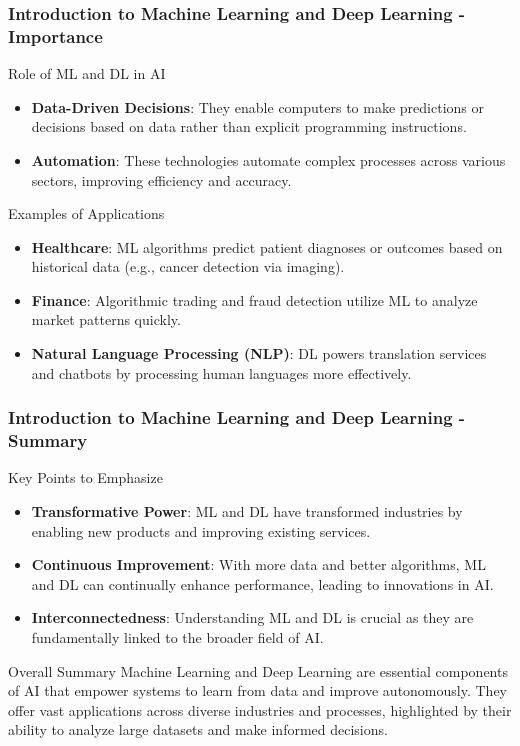 \documentclass[aspectratio=169]{beamer}
\begin{document}
\begin{frame}[fragile]
    \frametitle{Introduction to Machine Learning and Deep Learning - Importance}
    
    \begin{block}{Role of ML and DL in AI}
        \begin{itemize}
            \item \textbf{Data-Driven Decisions}: They enable computers to make predictions or decisions based on data rather than explicit programming instructions.
            \item \textbf{Automation}: These technologies automate complex processes across various sectors, improving efficiency and accuracy.
        \end{itemize}
    \end{block}
    
    \begin{block}{Examples of Applications}
        \begin{itemize}
            \item \textbf{Healthcare}: ML algorithms predict patient diagnoses or outcomes based on historical data (e.g., cancer detection via imaging).
            \item \textbf{Finance}: Algorithmic trading and fraud detection utilize ML to analyze market patterns quickly.
            \item \textbf{Natural Language Processing (NLP)}: DL powers translation services and chatbots by processing human languages more effectively.
        \end{itemize}
    \end{block}
\end{frame}

\begin{frame}[fragile]
    \frametitle{Introduction to Machine Learning and Deep Learning - Summary}
    
    \begin{block}{Key Points to Emphasize}
        \begin{itemize}
            \item \textbf{Transformative Power}: ML and DL have transformed industries by enabling new products and improving existing services.
            \item \textbf{Continuous Improvement}: With more data and better algorithms, ML and DL can continually enhance performance, leading to innovations in AI.
            \item \textbf{Interconnectedness}: Understanding ML and DL is crucial as they are fundamentally linked to the broader field of AI.
        \end{itemize}
    \end{block}

    \begin{block}{Overall Summary}
        Machine Learning and Deep Learning are essential components of AI that empower systems to learn from data and improve autonomously. They offer vast applications across diverse industries and processes, highlighted by their ability to analyze large datasets and make informed decisions.
    \end{block}
\end{frame}
\end{document}
